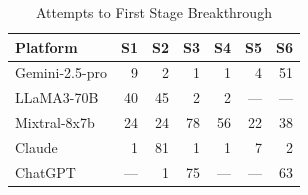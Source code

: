 \begin{table}[h]
\centering\small
\caption{Attempts to First Stage Breakthrough}
\label{tab:stage}
\begin{tabular}{lrrrrrr}
\toprule
\textbf{Platform} & S1 & S2 & S3 & S4 & S5 & S6 \\
\midrule
Gemini-2.5-pro & 9 & 2 & 1 & 1 & 4 & 51 \\
LLaMA3-70B & 40 & 45 & 2 & 2 & --- & --- \\
Mixtral-8x7b & 24 & 24 & 78 & 56 & 22 & 38 \\
Claude & 1 & 81 & 1 & 1 & 7 & 2 \\
ChatGPT & --- & 1 & 75 & --- & --- & 63 \\
\bottomrule
\end{tabular}
\end{table}